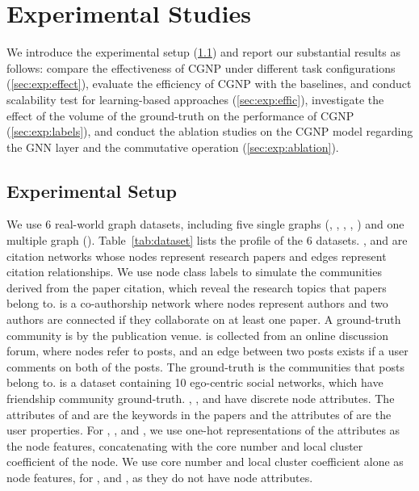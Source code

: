 \section{Experimental Studies}
\label{sec:exp}


We introduce the experimental setup (\cref{sec:exp:setup}) and report our  substantial results as follows:
 compare the effectiveness of CGNP under different task configurations (\cref{sec:exp:effect}),
 evaluate the efficiency of CGNP with the baselines, and conduct scalability test for learning-based approaches (\cref{sec:exp:effic}),
 investigate the effect of the volume of the ground-truth on the performance of CGNP (\cref{sec:exp:labels}), and 
 conduct the ablation studies on the CGNP model regarding the GNN layer and the commutative operation (\cref{sec:exp:ablation}). 

 
\subsection{Experimental Setup}
\label{sec:exp:setup}

 We use 6 real-world graph datasets, including five
single graphs (\Cora, \Citeseer, \Arxiv, \Reddit, \DBLP) and one
multiple graph (\Facebook).  Table~\ref{tab:dataset} lists the profile
of the 6 datasets.
%
\Cora, \Citeseer and \Arxiv are citation networks whose nodes
represent research papers and edges represent citation
relationships. We use node class labels to simulate the communities
derived from the paper citation, which reveal the research topics that
papers belong to.
%
\DBLP \cite{DBLP} is a co-authorship network where nodes represent
authors and two authors are connected if they collaborate on at least
one paper. A ground-truth community is by the publication venue.
%
%
\Reddit is collected from an online discussion forum, where nodes
refer to posts, and an edge between two posts exists if a user
comments on both of the posts.  The ground-truth is the communities
that posts belong to.
%
\Facebook is a dataset containing 10
ego-centric social networks, which have friendship community
ground-truth.
%
\Cora, \Citeseer, and \Facebook have discrete node attributes. The
attributes of \Cora and \Citeseer are the keywords in the papers and
the attributes of \Facebook are the user properties.  For \Cora,
\Citeseer, and \Facebook, we use one-hot representations of the
attributes as the node features, concatenating with the core number
and local cluster coefficient of the node.  We use core number and
local cluster coefficient alone as node features, for \Arxiv, \DBLP
and \Reddit, as they do not have node attributes. 


